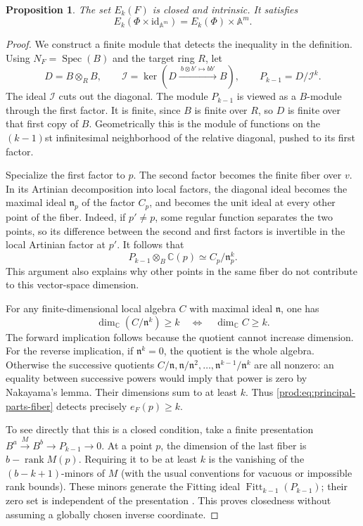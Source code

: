\documentclass[11pt]{article}
\numberwithin{equation}{section}
\theoremstyle{plain}
\newtheorem{proposition}[theorem]{Proposition}
\theoremstyle{definition}
\theoremstyle{remark}
\newcommand{\C}{\mathbb{C}}
\newcommand{\A}{\mathbb{A}}
\newcommand{\id}{\mathrm{id}}
\begin{document}
\begin{proposition}\label{prod:prop:length-strata}
The set $E_k(F)$ is closed and intrinsic. It satisfies
\[
 E_k(\Phi\times\id_{\A^m})=E_k(\Phi)\times\A^m.
\]
\end{proposition}
\begin{proof}
We construct a finite module that detects the inequality in the definition.
Using $N_F=\operatorname{Spec}(B)$ and the target ring $R$, let
\[
 D=B\otimes_R B,\qquad
 \mathcal I=\ker(D\xrightarrow{\ b\otimes b'\mapsto bb'\ }B),\qquad
 P_{k-1}=D/\mathcal I^k.
\]
The ideal $\mathcal I$ cuts out the diagonal. The module $P_{k-1}$ is
viewed as a $B$-module through the first factor. It is finite, since
$B$ is finite over $R$, so $D$ is finite over that first copy of $B$.
Geometrically this is the module of functions on the $(k-1)$st infinitesimal
neighborhood of the relative diagonal, pushed to its first factor.

Specialize the first factor to $p$. The second factor becomes the finite
fiber over $v$. In its Artinian decomposition into local factors, the
diagonal ideal becomes the maximal ideal $\mathfrak n_p$ of the factor
$C_p$, and becomes the unit ideal at every other point of the fiber.
Indeed, if $p'\ne p$, some regular function separates the two points, so
its difference between the second and first factors is invertible in the
local Artinian factor at $p'$. It follows that
\begin{equation}\label{prod:eq:principal-parts-fiber}
 P_{k-1}\otimes_B\C(p)\simeq C_p/\mathfrak n_p^k.
\end{equation}
This argument also explains why other points in the same fiber do not
contribute to this vector-space dimension.

For any finite-dimensional local algebra $C$ with maximal ideal
$\mathfrak n$, one has
\[
 \dim_\C(C/\mathfrak n^k)\geq k
 \quad\Longleftrightarrow\quad \dim_\C C\geq k.
\]
The forward implication follows because the quotient cannot increase
dimension. For the reverse implication, if $\mathfrak n^k=0$, the quotient
is the whole algebra. Otherwise the successive quotients
$C/\mathfrak n,\mathfrak n/\mathfrak n^2,\ldots,
\mathfrak n^{k-1}/\mathfrak n^k$ are all nonzero: an equality between
successive powers would imply that power is zero by Nakayama's lemma.
Their dimensions sum to at least $k$. Thus
\eqref{prod:eq:principal-parts-fiber} detects precisely $e_F(p)\geq k$.

To see directly that this is a closed condition, take a finite presentation
$B^a\xrightarrow{M}B^b\to P_{k-1}\to0$. At a point $p$, the dimension
of the last fiber is $b-\operatorname{rank}M(p)$. Requiring it to be at
least $k$ is the vanishing of the $(b-k+1)$-minors of $M$ (with the usual
conventions for vacuous or impossible rank bounds). These minors generate
the Fitting ideal $\operatorname{Fitt}_{k-1}(P_{k-1})$; their zero set is
independent of the presentation \cite{StacksFitting}. This proves closedness
without assuming a globally chosen inverse coordinate.


\end{proof}
\end{document}
